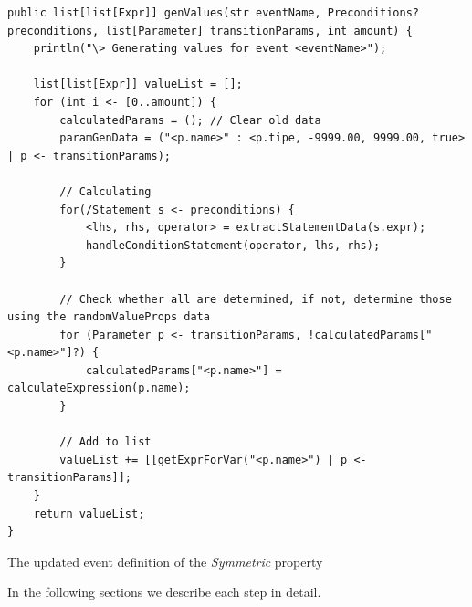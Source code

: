 \FloatBarrier
\begin{sourcecode}[!ht]
\begin{lstlisting}[language=Rascal]
public list[list[Expr]] genValues(str eventName, Preconditions? preconditions, list[Parameter] transitionParams, int amount) {
    println("\> Generating values for event <eventName>");

    list[list[Expr]] valueList = [];
    for (int i <- [0..amount]) {
        calculatedParams = (); // Clear old data
        paramGenData = ("<p.name>" : <p.tipe, -9999.00, 9999.00, true> | p <- transitionParams);

        // Calculating
        for(/Statement s <- preconditions) {
            <lhs, rhs, operator> = extractStatementData(s.expr);
            handleConditionStatement(operator, lhs, rhs);
        }

        // Check whether all are determined, if not, determine those using the randomValueProps data
        for (Parameter p <- transitionParams, !calculatedParams["<p.name>"]?) {
            calculatedParams["<p.name>"] = calculateExpression(p.name);
        }

        // Add to list
        valueList += [[getExprForVar("<p.name>") | p <- transitionParams]];
    }
    return valueList;
}
\end{lstlisting}
\caption{The updated event definition of the \textit{Symmetric} property}
\label{lst:experiment3_value_generation_code}
\end{sourcecode}
\FloatBarrier

In the following sections we describe each step in detail.

